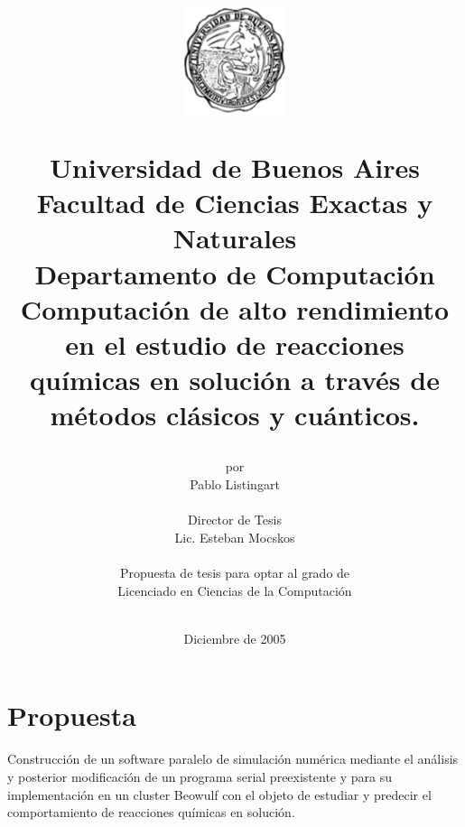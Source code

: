 \documentclass[a4paper, 12pt]{article}
\begin{document}

\title {
\begin{figure}[h]
\begin{center}
\includegraphics[keepaspectratio, width=3cm]{escudo}
\end{center}
\end{figure}
Universidad de Buenos Aires\\
Facultad de Ciencias Exactas y Naturales\\
Departamento de Computaci\'on\\
\vspace{10mm}
\Huge\textbf{Computaci\'on de alto rendimiento en el estudio de reacciones qu\'imicas en soluci\'on
a trav\'es de m\'etodos cl\'asicos y cu\'anticos.}
\vspace{10mm}
}

\author{por \\
    Pablo Listingart\\
        \\
        Director de Tesis\\
        Lic. Esteban Mocskos\\
        \\
        Propuesta de tesis para optar al grado de \\
        Licenciado en Ciencias de la Computaci\'on\\
        \\
        }
\date{Diciembre de 2005}

\maketitle

\pagebreak

\section*{Propuesta}

Construcci\'on de un software paralelo de simulaci\'on num\'erica mediante el an\'alisis y posterior modificaci\'on de un programa serial preexistente y para su implementaci\'on en un cluster Beowulf con el objeto de estudiar y predecir el comportamiento de reacciones qu\'imicas en soluci\'on.
\end{document}
